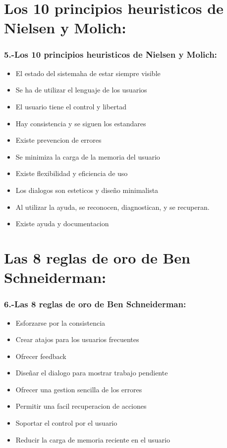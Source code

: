 \documentclass[11pt]{beamer}
\begin{document}
\section{Los 10 principios heuristicos de Nielsen y Molich:}
\begin{frame}
\frametitle{5.-Los 10 principios heuristicos de Nielsen y Molich:}

\begin{itemize}
\item El estado del sistemaha de estar siempre visible
\item Se ha de utilizar el lenguaje de los usuarios
\item El usuario tiene el control y libertad
\item Hay consistencia y se siguen los estandares
\item Existe prevencion de errores
\item Se minimiza la carga de la memoria del usuario
\item Existe flexibilidad y eficiencia de uso
\item Los dialogos son  esteticos y diseño minimalista
\item Al utilizar la ayuda, se reconocen, diagnostican, y se recuperan.
\item Existe ayuda y documentacion
\end{itemize}

\end{frame}

\section{Las 8 reglas de oro de Ben Schneiderman:}
\begin{frame}
\frametitle{6.-Las 8 reglas de oro de Ben Schneiderman:}

\begin{itemize}
\item Esforzarse por la consistencia
\item Crear atajos para los usuarios frecuentes
\item Ofrecer feedback
\item Diseñar el dialogo para mostrar trabajo pendiente
\item Ofrecer una gestion sencilla de los errores
\item Permitir una facil recuperacion de acciones
\item Soportar el control por el usuario
\item Reducir la carga de memoria reciente en el usuario
\end{itemize}

\end{frame}
\end{document}
